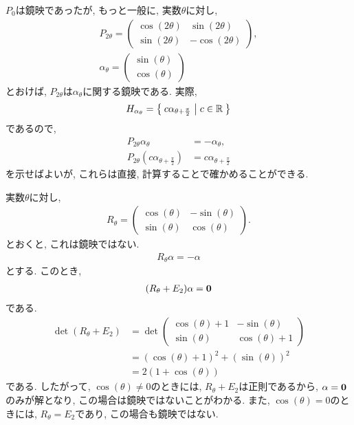 \begin{example}
  $P_0$は鏡映であったが,
  もっと一般に,
  実数$\theta$に対し,
\begin{align*}
  P_{2\theta}=
  \begin{pmatrix}
    \cos(2\theta) & \sin(2\theta) \\
    \sin(2\theta) & -\cos(2\theta) 
  \end{pmatrix},\\
  \alpha_\theta
  =
  \begin{pmatrix}
    \sin(\theta) \\
    \cos(\theta) 
  \end{pmatrix}
\end{align*}
とおけば, $P_{2\theta}$は$\alpha_\theta$に関する鏡映である.
実際,
\begin{align*}
  H_{\alpha_{\theta}} = \Set{c \alpha_{\theta+\frac{\pi}{2}}|c\in \mathbb{R}} 
\end{align*}
であるので,
\begin{align*}
  P_{2\theta}\alpha_{\theta} &= - \alpha_{\theta},\\
  P_{2\theta}(c\alpha_{\theta+\frac{\pi}{2}}) &= c\alpha_{\theta+\frac{\pi}{2}}
\end{align*}
を示せばよいが, これらは直接, 計算することで確かめることができる.
\end{example}

\begin{example}
 実数$\theta$に対し,
  \begin{align*}
    R_\theta=
    \begin{pmatrix}
      \cos(\theta) & -\sin(\theta) \\
      \sin(\theta) & \cos(\theta)
    \end{pmatrix}.
  \end{align*}
 とおくと, これは鏡映ではない.
 \begin{align*}
    R_\theta \alpha = -\alpha
 \end{align*}
 とする. このとき,
 \begin{align*}
    (R_\theta + E_2)\alpha = \boldsymbol{0}
 \end{align*}
 である.
 \begin{align*}
   \det(R_\theta + E_2) &= 
    \det \begin{pmatrix}
      \cos(\theta) +1 & -\sin(\theta) \\
      \sin(\theta) & \cos(\theta) +1 
    \end{pmatrix}\\
    &=(\cos(\theta) +1)^2 + (\sin(\theta))^2\\
    &=2(1+\cos(\theta))
 \end{align*}
 である.
 したがって, $\cos(\theta)\neq 0$のときには,
 $R_\theta + E_2$は正則であるから, $\alpha=\boldsymbol{0}$のみが解となり,
 この場合は鏡映ではないことがわかる.
 また,  $\cos(\theta)= 0$のときには, $R_\theta=E_2$であり,
 この場合も鏡映ではない.
\end{example}

